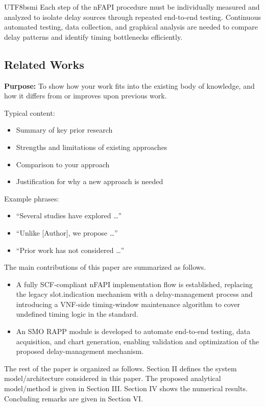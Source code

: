 \documentclass[conference]{IEEEtran}
\begin{document}
\begin{CJK}{UTF8}{bsmi}
{Each step of the nFAPI procedure must be individually measured and analyzed to isolate delay sources through repeated end-to-end testing. Continuous automated testing, data collection, and graphical analysis are needed to compare delay patterns and identify timing bottlenecks efficiently.
}

\subsection{Related Works}
{\bf Purpose:} To show how your work fits into the existing body of knowledge, and how it differs from or improves upon previous work.

Typical content:
\begin{itemize}
\item Summary of key prior research
\item Strengths and limitations of existing approaches
\item Comparison to your approach
\item Justification for why a new approach is needed
\end{itemize}

Example phrases:
\begin{itemize}
\item “Several studies have explored …”
\item “Unlike [Author], we propose …”
\item “Prior work has not considered …”
\end{itemize}



The main contributions of this paper are summarized as follows.
\begin{itemize}
\item A fully SCF-compliant nFAPI implementation flow is established, replacing the legacy slot.indication mechanism with a delay-management process and introducing a VNF-side timing-window maintenance algorithm to cover undefined timing logic in the standard.
\item An SMO RAPP module is developed to automate end-to-end testing, data acquisition, and chart generation, enabling validation and optimization of the proposed delay-management mechanism.
\end{itemize}

The rest of the paper is organized as follows. Section II defines the system model/architecture considered in this paper. The proposed analytical model/method is given in Section III. Section IV shows the numerical results. Concluding remarks are given in Section VI.



\end{CJK}
\end{document}
